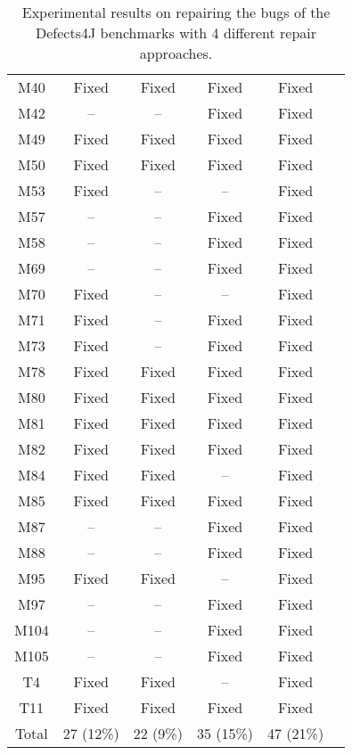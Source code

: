 \begin{table}[!t]
{\begin{tabular}{|c|c|c|c|c|c|}
M40               & Fixed     & Fixed     & Fixed     &Fixed   \\
M42               & --        & --        & Fixed     &Fixed   \\
M49               & Fixed     & Fixed     & Fixed     &Fixed   \\
M50               & Fixed     & Fixed     & Fixed     &Fixed   \\
M53               & Fixed     & --        & --        &Fixed   \\
M57               & --        & --        & Fixed     &Fixed   \\
M58               & --        & --        & Fixed     &Fixed   \\
M69               & --        & --        & Fixed     &Fixed   \\
M70               & Fixed     & --        & --        &Fixed   \\
M71               & Fixed     & --        & Fixed     &Fixed   \\
M73               & Fixed     & --        & Fixed     &Fixed   \\
M78               & Fixed     & Fixed     & Fixed     &Fixed   \\
M80               & Fixed     & Fixed     & Fixed     &Fixed   \\
M81               & Fixed     & Fixed     & Fixed     &Fixed   \\
M82               & Fixed     & Fixed     & Fixed     &Fixed   \\
M84               & Fixed     & Fixed     & --        &Fixed   \\
M85               & Fixed     & Fixed     & Fixed     &Fixed   \\
M87               & --        & --        & Fixed     &Fixed   \\
M88               & --        & --        & Fixed     &Fixed   \\
M95               & Fixed     & Fixed     & --        &Fixed   \\
M97               & --        & --        & Fixed     &Fixed   \\
M104              & --        & --        & Fixed     &Fixed   \\
M105              & --        & --        & Fixed     &Fixed   \\
\hline
T4                & Fixed     & Fixed     & --        &Fixed   \\
T11               & Fixed     & Fixed     & Fixed     &Fixed   \\
\hline
Total             & 27 (12\%) & 22 (9\%)  & 35 (15\%) & 47 (21\%)\\
\hline 
\end{tabular}%
}
\caption{Experimental results on repairing the bugs of the Defects4J benchmarks with 4 different repair approaches.}
\end{table}
